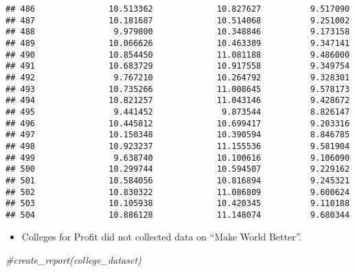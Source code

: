 \documentclass[
]{article}
\newenvironment{Shaded}{\begin{snugshade}}{\end{snugshade}}
\newcommand{\CommentTok}[1]{\textcolor[rgb]{0.56,0.35,0.01}{\textit{#1}}}
\newcommand{\DataTypeTok}[1]{\textcolor[rgb]{0.13,0.29,0.53}{#1}}
\newcommand{\FloatTok}[1]{\textcolor[rgb]{0.00,0.00,0.81}{#1}}
\newcommand{\KeywordTok}[1]{\textcolor[rgb]{0.13,0.29,0.53}{\textbf{#1}}}
\newcommand{\NormalTok}[1]{#1}
\newcommand{\OperatorTok}[1]{\textcolor[rgb]{0.81,0.36,0.00}{\textbf{#1}}}
\newcommand{\StringTok}[1]{\textcolor[rgb]{0.31,0.60,0.02}{#1}}
\providecommand{\tightlist}{%
  \setlength{\itemsep}{0pt}\setlength{\parskip}{0pt}}
\begin{document}
\begin{verbatim}
## 486               10.513362             10.827627          9.517090
## 487               10.181687             10.514068          9.251002
## 488                9.979800             10.348846          9.173158
## 489               10.066626             10.463389          9.347141
## 490               10.854450             11.081188          9.486000
## 491               10.683729             10.917558          9.349754
## 492                9.767210             10.264792          9.328301
## 493               10.735266             11.008645          9.578173
## 494               10.821257             11.043146          9.428672
## 495                9.441452              9.873544          8.826147
## 496               10.445812             10.699417          9.203316
## 497               10.150348             10.390594          8.846785
## 498               10.923237             11.155536          9.581904
## 499                9.638740             10.100616          9.106090
## 500               10.299744             10.594507          9.229162
## 501               10.584056             10.816894          9.245321
## 502               10.830322             11.086809          9.600624
## 503               10.105938             10.420345          9.110188
## 504               10.886128             11.148074          9.680344
\end{verbatim}

\begin{itemize}
\tightlist
\item
  Colleges for Profit did not collected data on ``Make World Better''.
\end{itemize}

\begin{Shaded}
\begin{Highlighting}[]
\CommentTok{#create_report(college_dataset)}
\end{Highlighting}
\end{Shaded}

\begin{Shaded}
\end{Shaded}
\end{document}
